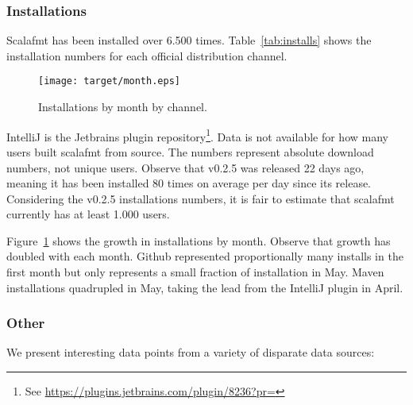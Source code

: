 \subsubsection{Installations}
Scalafmt has been installed over 6.500 times.
  Table~\ref{tab:installs} shows the installation numbers for each official distribution channel.
  \begin{figure}
    \CenterFloatBoxes
    \begin{floatrow}
      \ffigbox
      {\texttt{[image: target/month.eps]}}
      {\caption{Installations by month by channel.}\label{fig:installs}}
      \killfloatstyle
    \end{floatrow}
  \end{figure}
IntelliJ is the Jetbrains plugin repository\footnote{
  See \url{https://plugins.jetbrains.com/plugin/8236?pr=}
}.
Data is not available for how many users built scalafmt from source.
The numbers represent absolute download numbers, not unique users.
Observe that v0.2.5 was released 22 days ago, meaning it has been installed 80 times on average per day since its release.
Considering the v0.2.5 installations numbers, it is fair to estimate that scalafmt currently has at least 1.000 users.

Figure~\ref{fig:installs} shows the growth in installations by month.
Observe that growth has doubled with each month.
Github represented proportionally many installs in the first month but only represents a small fraction of installation in May.
Maven installations quadrupled in May, taking the lead from the IntelliJ plugin in April.


\subsubsection{Other}
We present interesting data points from a variety of disparate data sources:

